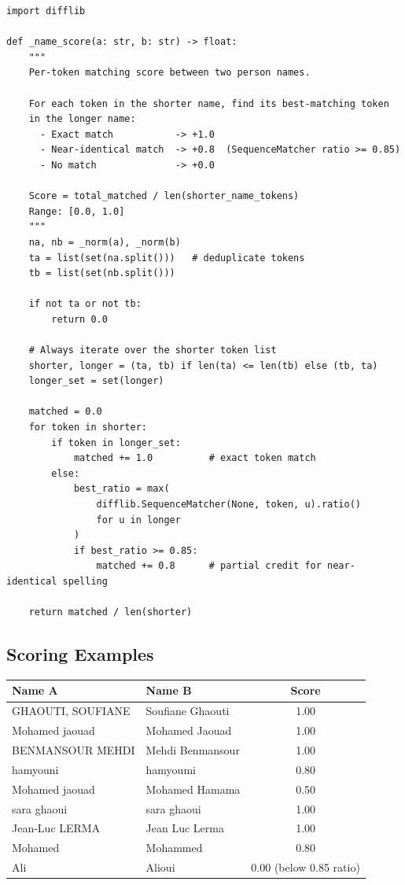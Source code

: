 \documentclass[12pt, a4paper]{article}
\begin{document}
\begin{lstlisting}[style=python, caption={\_name\_score: per-token similarity}]
import difflib

def _name_score(a: str, b: str) -> float:
    """
    Per-token matching score between two person names.

    For each token in the shorter name, find its best-matching token
    in the longer name:
      - Exact match           -> +1.0
      - Near-identical match  -> +0.8  (SequenceMatcher ratio >= 0.85)
      - No match              -> +0.0

    Score = total_matched / len(shorter_name_tokens)
    Range: [0.0, 1.0]
    """
    na, nb = _norm(a), _norm(b)
    ta = list(set(na.split()))   # deduplicate tokens
    tb = list(set(nb.split()))

    if not ta or not tb:
        return 0.0

    # Always iterate over the shorter token list
    shorter, longer = (ta, tb) if len(ta) <= len(tb) else (tb, ta)
    longer_set = set(longer)

    matched = 0.0
    for token in shorter:
        if token in longer_set:
            matched += 1.0          # exact token match
        else:
            best_ratio = max(
                difflib.SequenceMatcher(None, token, u).ratio()
                for u in longer
            )
            if best_ratio >= 0.85:
                matched += 0.8      # partial credit for near-identical spelling

    return matched / len(shorter)
\end{lstlisting}

\subsection{Scoring Examples}

\begin{center}
\begin{tabular}{llc}
    \toprule
    \textbf{Name A} & \textbf{Name B} & \textbf{Score} \\
    \midrule
    GHAOUTI, SOUFIANE   & Soufiane Ghaouti  & 1.00 \\
    Mohamed jaouad      & Mohamed Jaouad    & 1.00 \\
    BENMANSOUR MEHDI    & Mehdi Benmansour  & 1.00 \\
    hamyouni            & hamyoumi          & 0.80 \\
    Mohamed jaouad      & Mohamed Hamama    & 0.50 \\
    sara ghaoui         & sara ghaoui       & 1.00 \\
    Jean-Luc LERMA      & Jean Luc Lerma    & 1.00 \\
    Mohamed             & Mohammed          & 0.80 \\
    Ali                 & Alioui            & 0.00 (below 0.85 ratio) \\
    \bottomrule
\end{tabular}
\end{center}
\end{document}
